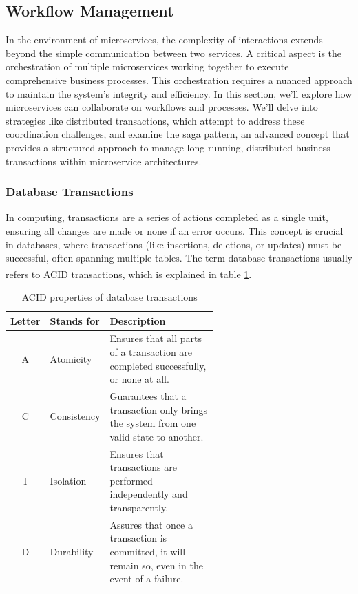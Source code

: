 \subsection{Workflow Management}
In the environment of microservices, the complexity of interactions extends beyond the simple
communication between two services. A critical aspect is the orchestration of multiple microservices
working together to execute comprehensive business processes. This orchestration requires a nuanced
approach to maintain the system's integrity and efficiency.
\newline\newline
In this section, we'll explore how microservices can collaborate on workflows and processes. We'll
delve into strategies like distributed transactions, which attempt to address these coordination
challenges, and examine the saga pattern, an advanced concept that provides a structured approach to
manage long-running, distributed business transactions within microservice architectures.

\subsubsection{Database Transactions}
In computing, transactions are a series of actions completed as a single unit, ensuring all changes
are made or none if an error occurs. This concept is crucial in databases, where transactions (like
insertions, deletions, or updates) must be successful, often spanning multiple tables. The term
database transactions usually refers to ACID transactions\textsuperscript{\cite{microservice_acid}},
which is explained in table \ref{tab:acid}.

\begin{table}
    \centering
    \begin{tabular}{|c|l|p{0.6\linewidth}|}
        \hline
        \textbf{Letter} & \textbf{Stands for} & \textbf{Description}                                                                             \\ \hline
        A               & Atomicity           & Ensures that all parts of a transaction are completed successfully, or none at all.              \\ \hline
        C               & Consistency         & Guarantees that a transaction only brings the system from one valid state to another.            \\ \hline
        I               & Isolation           & Ensures that transactions are performed independently and transparently.                         \\ \hline
        D               & Durability          & Assures that once a transaction is committed, it will remain so, even in the event of a failure. \\ \hline
    \end{tabular}
    \caption{ACID properties of database transactions}
    \label{tab:acid}
\end{table}

